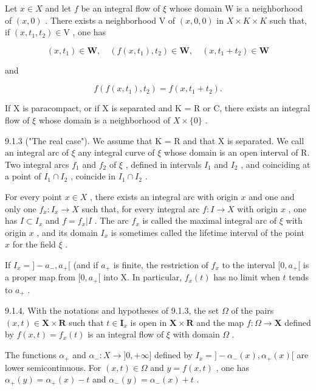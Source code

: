 Let \(x\in X\) and let \(f\) be an integral flow of \(\xi\) whose domain W is a neighborhood of \((x,0)\) . There exists a neighborhood V of \((x,0,0)\) in \(X \times K \times K\) such that, if \((x,t_{1},t_{2})\in\mathrm{V}\) , one has

\[
(x, t _ {1}) \in \mathbf {W}, \quad (f (x, t _ {1}), t _ {2}) \in \mathbf {W}, \quad (x, t _ {1} + t _ {2}) \in \mathbf {W}
\]

and

\[
f (f (x, t _ {1}), t _ {2}) = f (x, t _ {1} + t _ {2}).\tag{2}
\]

If X is paracompact, or if X is separated and K = R or C, there exists an integral flow of \(\xi\) whose domain is a neighborhood of \(X \times \{0\}\) .

9.1.3 ("The real case"). We assume that K = R and that X is separated. We call an integral arc of \(\xi\) any integral curve of \(\xi\) whose domain is an open interval of R. Two integral arcs \(f_{1}\) and \(f_{2}\) of \(\xi\) , defined in intervals \(I_{1}\) and \(I_{2}\) , and coinciding at a point of \(I_{1} \cap I_{2}\) , coincide in \(I_{1} \cap I_{2}\) .

For every point \(x \in X\) , there exists an integral arc with origin \(x\) and one and only one \(f_x: I_x \to X\) such that, for every integral arc \(f: I \to X\) with origin \(x\) , one has \(I \subset I_x\) and \(f = f_x|I\) . The arc \(f_x\) is called the maximal integral arc of \(\xi\) with origin \(x\) , and its domain \(I_x\) is sometimes called the lifetime interval of the point \(x\) for the field \(\xi\) .

If \(I_x = ]-a_-,a_+[\) (and if \(a_+\) is finite, the restriction of \(f_x\) to the interval \([0,a_+[\) is a proper map from \([0,a_+[\) into X. In particular, \(f_x(t)\) has no limit when \(t\) tends to \(a_+\) .

9.1.4. With the notations and hypotheses of 9.1.3, the set \(\Omega\) of the pairs \((x,t)\in\mathbf{X}\times\mathbf{R}\) such that \(t\in\mathbf{I}_{x}\) is open in \(\mathbf{X}\times\mathbf{R}\) and the map \(f\colon\Omega\to\mathbf{X}\) defined by \(f(x,t)=f_{x}(t)\) is an integral flow of \(\xi\) with domain \(\Omega\) .

The functions \(\alpha_{+}\) and \(\alpha_{-}: X \to ]0,+\infty]\) defined by \(I_{x} = ]-\alpha_{-}(x),\alpha_{+}(x)[\) are lower semicontinuous. For \((x, t) \in \Omega\) and \(y = f(x, t)\) , one has \(\alpha_{+}(y) = \alpha_{+}(x) - t\) and \(\alpha_{-}(y) = \alpha_{-}(x) + t\) .

